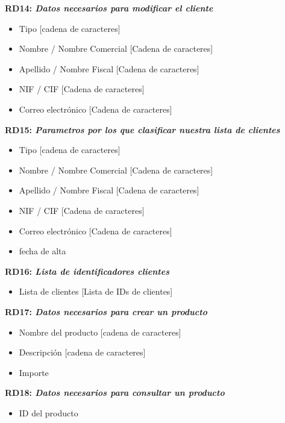 \documentclass[paper=a4, fontsize=11pt, spanish]{scrartcl}
\begin{document}
\setlength{\parindent}{0em}
\textbf{RD14: \textit{Datos necesarios para modificar el cliente}}
\setlength{\parindent}{2em}
\begin{itemize}
\item Tipo [cadena de caracteres]
\item Nombre / Nombre Comercial [Cadena de caracteres]
\item Apellido / Nombre Fiscal [Cadena de caracteres]
\item NIF / CIF [Cadena de caracteres]
\item Correo electrónico [Cadena de caracteres]
\end{itemize}

\setlength{\parindent}{0em}
\textbf{RD15: \textit{Parametros por los que clasificar nuestra lista de clientes}}
\setlength{\parindent}{2em}
\begin{itemize}
\item Tipo [cadena de caracteres]
\item Nombre / Nombre Comercial [Cadena de caracteres]
\item Apellido / Nombre Fiscal [Cadena de caracteres]
\item NIF / CIF [Cadena de caracteres]
\item Correo electrónico [Cadena de caracteres]
\item fecha de alta
\end{itemize}

\setlength{\parindent}{0em}
\textbf{RD16: \textit{Lista de identificadores clientes}}
\setlength{\parindent}{2em}
\begin{itemize}
\item Lista de clientes [Lista de IDs de clientes]
\end{itemize}

\setlength{\parindent}{0em}
	\textbf{RD17: \textit{Datos necesarios para crear un producto}}
	\setlength{\parindent}{2em}
	\begin{itemize}
		\item Nombre del producto [cadena de caracteres]
		\item Descripción [cadena de caracteres]
		\item Importe
	\end{itemize}
	
	\setlength{\parindent}{0em}
	\textbf{RD18: \textit{Datos necesarios para consultar un producto}}
	\setlength{\parindent}{2em}
	\begin{itemize}
		\item ID del producto
	\end{itemize}
	
\end{document}

